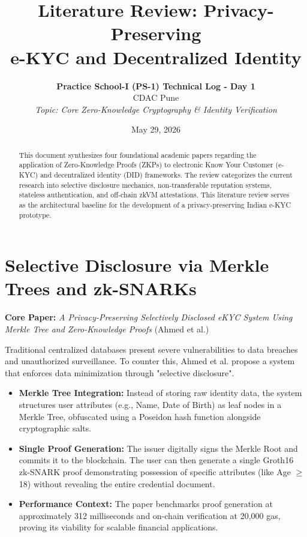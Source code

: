 \documentclass[12pt, a4paper]{article}
\title{\textbf{Literature Review: Privacy-Preserving \\ e-KYC and Decentralized Identity}}
\author{
    \textbf{Practice School-I (PS-1) Technical Log - Day 1} \\ 
    CDAC Pune \\
    \textit{Topic: Core Zero-Knowledge Cryptography \& Identity Verification}
}
\date{May 29, 2026}
\begin{document}
\maketitle

\begin{abstract}
This document synthesizes four foundational academic papers regarding the application of Zero-Knowledge Proofs (ZKPs) to electronic Know Your Customer (e-KYC) and decentralized identity (DID) frameworks. The review categorizes the current research into selective disclosure mechanics, non-transferable reputation systems, stateless authentication, and off-chain zkVM attestations. This literature review serves as the architectural baseline for the development of a privacy-preserving Indian e-KYC prototype.
\end{abstract}

\vspace{0.5cm}

\section{Selective Disclosure via Merkle Trees and zk-SNARKs}
\textbf{Core Paper:} \textit{A Privacy-Preserving Selectively Disclosed eKYC System Using Merkle Tree and Zero-Knowledge Proofs} (Ahmed et al.)

Traditional centralized databases present severe vulnerabilities to data breaches and unauthorized surveillance. To counter this, Ahmed et al. propose a system that enforces data minimization through "selective disclosure".
\begin{itemize}
    \item \textbf{Merkle Tree Integration:} Instead of storing raw identity data, the system structures user attributes (e.g., Name, Date of Birth) as leaf nodes in a Merkle Tree, obfuscated using a Poseidon hash function alongside cryptographic salts. 
    \item \textbf{Single Proof Generation:} The issuer digitally signs the Merkle Root and commits it to the blockchain. The user can then generate a single Groth16 zk-SNARK proof demonstrating possession of specific attributes (like Age $\ge$ 18) without revealing the entire credential document.
    \item \textbf{Performance Context:} The paper benchmarks proof generation at approximately 312 milliseconds and on-chain verification at 20,000 gas, proving its viability for scalable financial applications.
\end{itemize}
\end{document}
